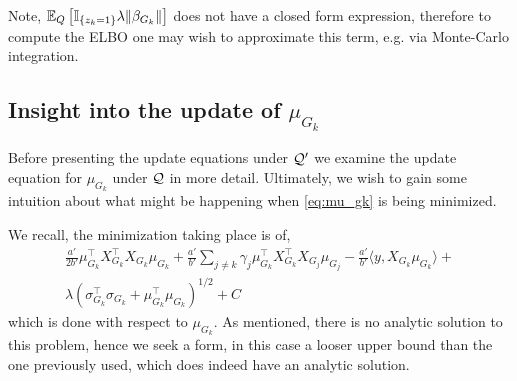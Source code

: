 Note, $\mathbb{E}_Q \left[ \mathbb{I}_{\{z_k = 1\}} \lambda \| \beta_{G_k} \| \right] $ does not have a closed form expression, therefore to compute the ELBO one may wish to approximate this term, e.g. via Monte-Carlo integration.


\subsection{Insight into the update of $\mu_{G_k}$}

Before presenting the update equations under $\mathcal{Q}'$ we examine the update equation for $\mu_{G_k}$ under $\mathcal{Q}$ in more detail. Ultimately, we wish to gain some intuition about what might be happening when \eqref{eq:mu_gk} is being minimized. 

We recall, the minimization taking place is of,
\begin{equation*}
\begin{aligned}
    \frac{a'}{2b'} 
    \mu_{G_k}^\top X_{G_k}^\top X_{G_k} \mu_{G_k}
+
    \frac{a'}{b'} 
    \sum_{j \neq k} 
	\gamma_j \mu_{G_k}^\top X_{G_k}^\top X_{G_j} \mu_{G_j} 
-
    \frac{a'}{b'}
    \langle y, X_{G_k} \mu_{G_k} \rangle
+ \\
    \lambda \left( \sigma_{G_k}^\top \sigma_{G_k} + \mu_{G_k}^\top \mu_{G_k} \right)^{1/2} + C
\end{aligned}
\end{equation*}
which is done with respect to $\mu_{G_k}$. As mentioned, there is no analytic solution to this problem, hence we seek a form, in this case a looser upper bound than the one previously used, which does indeed have an analytic solution.

